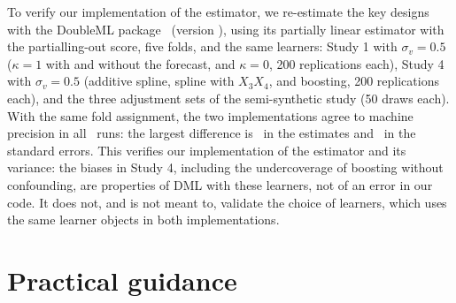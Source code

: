 \documentclass[11pt]{article}
\theoremstyle{remark}
\begin{document}
To verify our implementation of the estimator, we re-estimate the key designs with the DoubleML package~\citep{bach2022} (version \DmlVersion), using its partially linear estimator with the partialling-out score, five folds, and the same learners: Study 1 with $\sigma_v = 0.5$ ($\kappa = 1$ with and without the forecast, and $\kappa = 0$, 200 replications each), Study 4 with $\sigma_v = 0.5$ (additive spline, spline with $X_3 X_4$, and boosting, 200 replications each), and the three adjustment sets of the semi-synthetic study (50 draws each). With the same fold assignment, the two implementations agree to machine precision in all \DmlRuns\ runs: the largest difference is \DmlMaxDiff\ in the estimates and \DmlMaxSEDiff\ in the standard errors. This verifies our implementation of the estimator and its variance: the biases in Study 4, including the undercoverage of boosting without confounding, are properties of DML with these learners, not of an error in our code. It does not, and is not meant to, validate the choice of learners, which uses the same learner objects in both implementations.

\section{Practical guidance}
\label{sec:practice}
\end{document}
